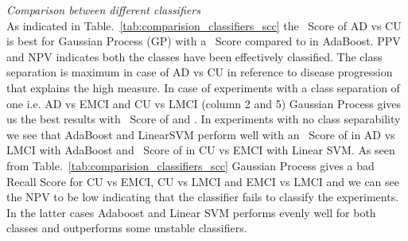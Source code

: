 \textit{Comparison between different classifiers}\\
As indicated in Table.~\ref{tab:comparision_classifiers_scc} the \F~Score of AD vs CU is best for Gaussian Process (GP) with a  \F~Score compared to  in AdaBoost.  PPV and  NPV indicates both the classes have been effectively classified. The class separation is maximum in case of AD vs CU in reference to disease progression that explains the high \F measure. 
In case of experiments with a class separation of one i.e. AD vs EMCI and CU vs LMCI (column 2 and 5) Gaussian Process gives us the best results with \F~Score of  and . In experiments with no class separability we see that AdaBoost and LinearSVM perform well with an \F~Score of  in AD vs LMCI with AdaBoost and \F~Score of  in CU vs EMCI with Linear SVM. 
As seen from Table.~\ref{tab:comparision_classifiers_scc} Gaussian Process gives a bad Recall Score for CU vs EMCI, CU vs LMCI and EMCI vs LMCI and we can see the NPV to be low indicating that the classifier fails to classify the experiments. In the latter cases Adaboost and Linear SVM performs evenly well for both classes and outperforms some unstable classifiers.     

